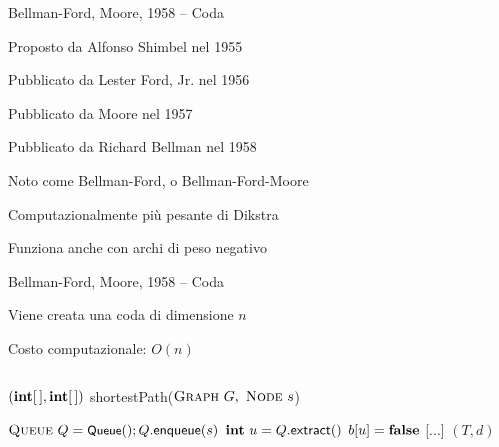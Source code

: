 \begin{frame}{Bellman-Ford, Moore, 1958 -- Coda}

\vspace{-9pt}
\begin{myboxtitle}[Storia]
\BI
\item Proposto da Alfonso Shimbel nel 1955
\item Pubblicato da Lester Ford, Jr. nel 1956
\item Pubblicato da Moore nel 1957
\item Pubblicato da Richard Bellman nel 1958
\item Noto come Bellman-Ford, o Bellman-Ford-Moore
\EI
\end{myboxtitle}

\begin{myboxtitle}[Note]
\BI
\item Computazionalmente più pesante di Dikstra
\item Funziona anche con archi di peso negativo
\EI
\end{myboxtitle}

\end{frame}


\begin{frame}{Bellman-Ford, Moore, 1958 -- Coda}

\vspace{-9pt}
\begin{myboxtitle}
\BI
\item Viene creata una coda di dimensione $n$
\item Costo computazionale: $O(n)$
\EI
\end{myboxtitle}

\vspace{-18pt}
\begin{columns}
\small
\begin{Procedure}
\caption[A]{$(\INTARRAY, \INTARRAY)$ \textsf{shortestPath}($\textsc{Graph}\ G,\ \textsc{Node}\ s$)}
\alert{$\textsc{Queue}\ Q = \textsf{{\small Queue}}(); Q.\textsf{enqueue}(s)$}\;
{
  $\INTEGER\ u = Q.\textsf{extract}()$\;
  $b[u] = \FALSE$\;
  {
    {
      [...]
    }
  }
}
\Return $(T,d)$
\end{Procedure}
\end{columns}

\end{frame}


